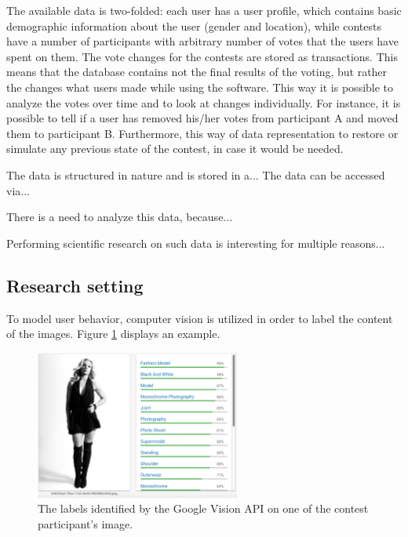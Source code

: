     The available data is two-folded: each user has a user profile, which contains basic demographic information about the user (gender and location), while contests have a number of participants with arbitrary number of votes that the users have spent on them. The vote changes for the contests are stored as transactions. This means that the database contains not the final results of the voting, but rather the changes what users made while using the software. This way it is possible to analyze the votes over time and to look at changes individually. For instance, it is possible to tell if a user has removed his/her votes from participant A and moved them to participant B. Furthermore, this way of data representation to restore or simulate any previous state of the contest, in case it would be needed.

    The data is structured in nature and is stored in a... The data can be accessed via...

    There is a need to analyze this data, because...

    Performing scientific research on such data is interesting for multiple reasons...

\subsection{Research setting}
    To model user behavior, computer vision is utilized in order to label the content of the images. Figure \ref{google_vision_labels} displays an example.

    \begin{figure}[h] 
		\begin{center}
			\includegraphics[width=0.6\textwidth]{images/google_vision_labels.png}
			\caption{The labels identified by the Google Vision API on one of the contest participant's image.}
			\label{google_vision_labels}
		\end{center}
	\end{figure}

